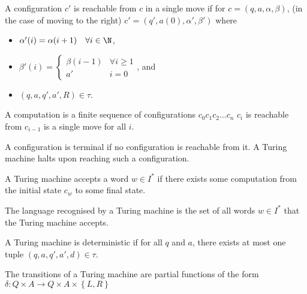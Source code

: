\documentclass{article}
\begin{document}
\begin{definition}[Reachable]
    A configuration \(c'\) is reachable from \(c\) in a single move if
    for \(c = \left(q, a, \alpha, \beta\right)\),
    (in the case of moving to the right)
    \(c' = \left(q', a(0), \alpha', \beta'\right)\) where
    \begin{itemize}
        \item \(\alpha'(i)=\alpha(i+1) \quad \forall i \in \N\),
        \item \(\beta'(i)=\begin{cases}
            \beta(i-1) & \forall i \ge 1 \\
            a' & i=0
        \end{cases}\), and
        \item \(\left(q, a, q', a', R\right)\in\tau\).
    \end{itemize}
\end{definition}
\begin{definition}[Computation]
    A computation is a finite sequence of configurations
    \(c_0 c_1 c_2 \ldots c_n\) \st
    \(c_i\) is reachable from \(c_{i-1}\) is a single move for all \(i\).
\end{definition}
\begin{definition}[Terminal]
    A configuration is terminal if no configuration is reachable from it.
    A Turing machine halts upon reaching such a configuration.
\end{definition}
\begin{definition}[Acceptinng]
    A Turing machine accepts a word \(w\in I^*\)
    if there exists some computation from the initial state \(c_w\)
    to some final state.
\end{definition}
\begin{definition}[Recognised]
    The language recognised by a Turing machine
    is the set of all words \(w \in I^*\) that the Turing machine accepts.
\end{definition}
\begin{definition}[Deterministic]
    A Turing machine is deterministic if   
    for all \(q\) and \(a\), there exists at most one tuple
    \(\left(q, a, q', a', d\right)\in\tau\).
\end{definition}
\begin{theorem}
    The transitions of a Turing machine are partial functions
    of the form
    \(\delta : Q\times A \to Q \times A \times \left\{L, R\right\}\)
\end{theorem}
\newpage
\end{document}
